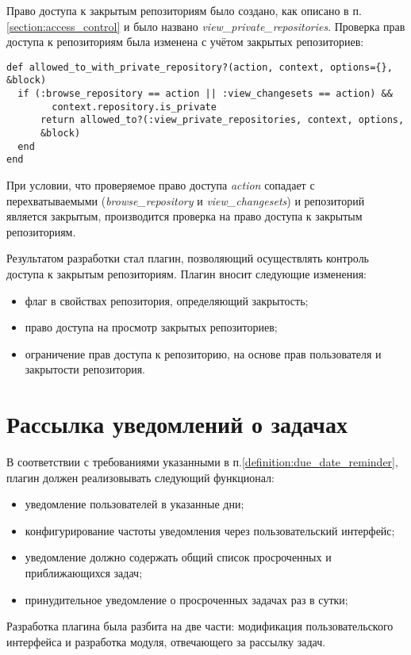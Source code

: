 Право доступа к закрытым репозиториям было создано, как описано в п.
\ref{section:access_control} и было названо
\textit{view\_private\_repositories}.
Проверка прав доступа к репозиториям была изменена с учётом закрытых
репозиториев:
\small{\begin{lstlisting}
def allowed_to_with_private_repository?(action, context, options={}, &block)
  if (:browse_repository == action || :view_changesets == action) &&
        context.repository.is_private 
      return allowed_to?(:view_private_repositories, context, options,
      &block)       
  end
end
\end{lstlisting}}
При условии, что проверяемое право доступа \textit{action} сопадает с
перехватываемыми (\textit{browse\_repository } и \textit{view\_changesets}) и
репозиторий является закрытым, производится проверка на право доступа к
закрытым репозиториям.

Результатом разработки стал плагин, позволяющий осуществлять контроль доступа к
закрытым репозиториям. Плагин вносит следующие изменения:
\begin{itemize}
  \item флаг в свойствах репозитория, определяющий закрытость;
  \item право доступа на просмотр закрытых репозиториев;
  \item ограничение прав доступа к репозиторию, на основе прав пользователя и
  закрытости репозитория.
\end{itemize}


\section{Рассылка уведомлений о задачах}
В соответствии с требованиями указанными в
п.\ref{definition:due_date_reminder}, плагин должен реализовывать следующий
функционал:
\begin{itemize}
  \item уведомление пользователей в указанные дни;
  \item конфигурирование частоты уведомления через пользовательский интерфейс;
  \item уведомление должно содержать общий список просроченных и приближающихся
  задач;
  \item принудительное уведомление о просроченных задачах раз в сутки;
\end{itemize}
Разработка плагина была разбита на две части: модификация пользовательского
интерфейса и разработка модуля, отвечающего за рассылку задач.


